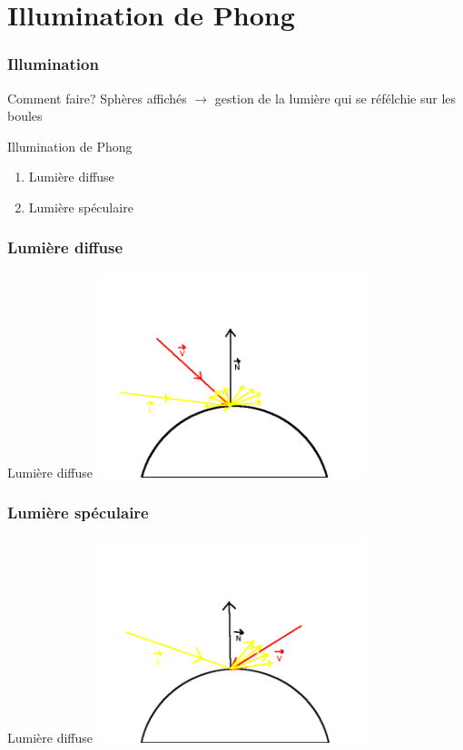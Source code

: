 \section{Illumination de Phong}

\begin{frame}
	\frametitle{Illumination}
	\begin{block}{Comment faire?}
		Sphères affichés $\rightarrow$ gestion de la lumière qui se réfélchie sur les boules
	\end{block}
	\begin{block}{Illumination de Phong}
		\begin{enumerate}
			\item Lumière diffuse
			\item Lumière spéculaire
		\end{enumerate}
	\end{block}
\end{frame}
	
\begin{frame}
	\frametitle{Lumière diffuse}
	\begin{block}{Lumière diffuse}
		\includegraphics[width = 300px]{phong1.png} 
	\end{block}
\end{frame}
	
\begin{frame}
	\frametitle{Lumière spéculaire}
	\begin{block}{Lumière diffuse}
		\includegraphics[width = 300px]{phong2.png} 
	\end{block}
\end{frame}

